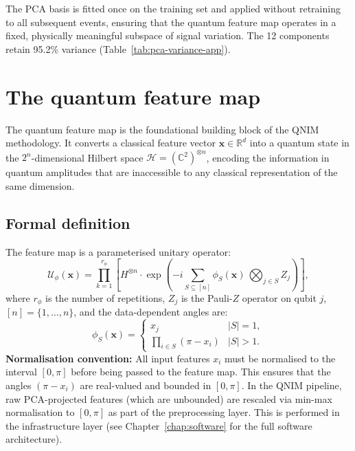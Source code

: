 \documentclass[11pt,a4paper, english]{book}
\theoremstyle{plain}
\theoremstyle{definition}
\numberwithin{equation}{chapter}
\numberwithin{figure}{chapter}
\numberwithin{table}{chapter}
\begin{document}
The PCA basis is fitted once on the training set and applied without
retraining to all subsequent events, ensuring that the quantum feature
map operates in a fixed, physically meaningful subspace of signal
variation. The 12 components retain 95.2\% variance (Table~\ref{tab:pca-variance-app}).

\section{The quantum feature map}
\label{sec:qfm}

The quantum feature map is the foundational building block of the QNIM
methodology.  It converts a classical feature vector $\mathbf{x} \in
\mathbb{R}^{d}$ into a quantum state in the $2^n$-dimensional Hilbert space
$\mathcal{H} = (\mathbb{C}^2)^{\otimes n}$, encoding the information in
quantum amplitudes that are inaccessible to any classical representation
of the same dimension.

\subsection{Formal definition}
\label{subsec:qfm-formal}

The feature map is a parameterised unitary operator:
\begin{equation}
  \label{eq:feature_unitary}
  \mathcal{U}_\phi(\mathbf{x}) =
    \prod_{k=1}^{r_\phi}
    \left[ {H}^{\otimes n} \cdot
    \exp\!\left(-i\sum_{S \subseteq [n]}\phi_S(\mathbf{x})\,\bigotimes_{j\in S}Z_j
    \right) \right],
\end{equation}
where $r_\phi$ is the number of repetitions, $Z_j$ is the Pauli-$Z$
operator on qubit $j$, $[n] = \{1,\ldots,n\}$, and the data-dependent
angles are:
\begin{equation}
  \label{eq:phi_angles}
  \phi_S(\mathbf{x}) =
  \begin{cases}
    x_j & |S| = 1, \\
    \prod_{i \in S}(\pi - x_i) & |S| > 1.
  \end{cases}
\end{equation}
\noindent\textbf{Normalisation convention:} All input features $x_i$ must be
normalised to the interval $[0, \pi]$ before being passed to the feature map.
This ensures that the angles $(\pi - x_i)$ are real-valued and bounded in
$[0, \pi]$. In the QNIM pipeline, raw PCA-projected features (which are
unbounded) are rescaled via min-max normalisation to $[0,\pi]$ as part of
the preprocessing layer. This is performed in the infrastructure layer
(see Chapter~\ref{chap:software} for the full software architecture).
\end{document}
